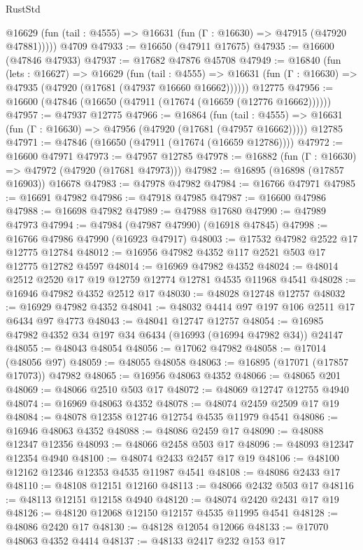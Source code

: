 \begin{lexlean}{RustStd}
\begin{coremodule}
      @16629 (fun (tail : @4555) => @16631 (fun (Γ : @16630) => @47915 (@47920 @47881)))))
    @4709
@47933 := @16650 (@47911 @17675)
@47935 := @16600 (@47846 @47933)
@47937 := @17682 @47876 @45708
@47949 := @16840
    (fun (lets : @16627) =>
    @16629
      (fun (tail : @4555) =>
      @16631 (fun (Γ : @16630) => @47935 (@47920 (@17681 (@47937 @16660 @16662))))))
    @12775
@47956 := @16600 (@47846 (@16650 (@47911 (@17674 (@16659 (@12776 @16662))))))
@47957 := @47937 @12775
@47966 := @16864
    (fun (tail : @4555) => @16631 (fun (Γ : @16630) => @47956 (@47920 (@17681 (@47957 @16662)))))
    @12785
@47971 := @47846 (@16650 (@47911 (@17674 (@16659 @12786))))
@47972 := @16600 @47971
@47973 := @47957 @12785
@47978 := @16882 (fun (Γ : @16630) => @47972 (@47920 (@17681 @47973)))
@47982 := @16895 (@16898 (@17857 @16903)) @16678
@47983 := @47978 @47982
@47984 := @16766 @47971
@47985 := @16691 @47982
@47986 := @47918 @47985
@47987 := @16600 @47986
@47988 := @16698 @47982
@47989 := @47988 @17680
@47990 := @47989 @47973
@47994 := @47984 (@47987 @47990) (@16918 @47845)
@47998 := @16766 @47986 @47990 (@16923 @47917)
@48003 := @17532 @47982 @2522 @17 @12775 @12784
@48012 := @16956 @47982 @4352 @117 @2521 @503 @17 @12775 @12782 @4597
@48014 := @16969 @47982 @4352
@48024 := @48014 @2512 @2520 @17 @19 @12759 @12774 @12781 @4535 @11968 @4541
@48028 := @16946 @47982 @4352 @2512 @17
@48030 := @48028 @12748 @12757
@48032 := @16929 @47982 @4352
@48041 := @48032 @4414 @97 @197 @106 @2511 @17 @6434 @97 @4773
@48043 := @48041 @12747 @12757
@48054 := @16985 @47982 @4352 @34 @197 @34 @6434 (@16993 (@16994 @47982 @34)) @24147
@48055 := @48043 @48054
@48056 := @17062 @47982
@48058 := @17014 (@48056 @97)
@48059 := @48055 @48058
@48063 := @16895 (@17071 (@17857 @17073)) @47982
@48065 := @16956 @48063 @4352
@48066 := @48065 @201
@48069 := @48066 @2510 @503 @17
@48072 := @48069 @12747 @12755 @4940
@48074 := @16969 @48063 @4352
@48078 := @48074 @2459 @2509 @17 @19
@48084 := @48078 @12358 @12746 @12754 @4535 @11979 @4541
@48086 := @16946 @48063 @4352
@48088 := @48086 @2459 @17
@48090 := @48088 @12347 @12356
@48093 := @48066 @2458 @503 @17
@48096 := @48093 @12347 @12354 @4940
@48100 := @48074 @2433 @2457 @17 @19
@48106 := @48100 @12162 @12346 @12353 @4535 @11987 @4541
@48108 := @48086 @2433 @17
@48110 := @48108 @12151 @12160
@48113 := @48066 @2432 @503 @17
@48116 := @48113 @12151 @12158 @4940
@48120 := @48074 @2420 @2431 @17 @19
@48126 := @48120 @12068 @12150 @12157 @4535 @11995 @4541
@48128 := @48086 @2420 @17
@48130 := @48128 @12054 @12066
@48133 := @17070 @48063 @4352 @4414
@48137 := @48133 @2417 @232 @153 @17

\end{coremodule}
\end{lexlean}
